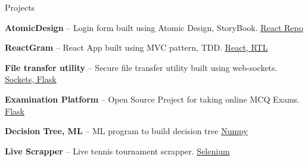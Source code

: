 \documentclass{resume} %
\begin{document}
\begin{rSection}{Projects}
  \begin{rProjectSection}
    \item \textbf {AtomicDesign} -- Login form built using Atomic Design, StoryBook.
    \href{https://github.com/amarkrsinha1997/atomic-design}{React Repo}
    \item \textbf {ReactGram} -- React App built using MVC pattern, TDD.
    \href{https://github.com/amarkrsinha1997/reactgram}{React, RTL}
    \item \textbf {File transfer utility} -- Secure file transfer utility built using web-sockets. \href{https://github.com/amarkrsinha1997/secure-filetransfer}{Sockets, Flask}
    \item \textbf {Examination Platform} -- Open Source Project for taking online MCQ Exams. \href{https://github.com/amarkrsinha1997/MCQ-Testing-Platform}{Flask}
    \item \textbf {Decision Tree, ML} -- ML program to build decision tree \href{https://github.com/amarkrsinha1997/ml-university-exercise}{Numpy}
    \item \textbf {Live Scrapper} -- Live tennis tournament scrapper. \href{https://github.com/amarkrsinha1997/tennis-live-data-scrapper}{Selenium}
  \end{rProjectSection}

\end{rSection}


\end{document}
